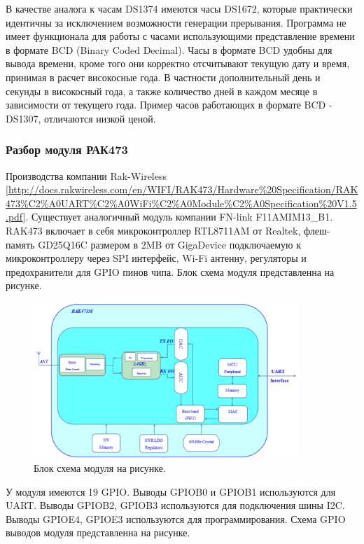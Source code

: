 В качестве аналога к часам DS1374 имеются часы DS1672, которые практически идентичны за исключением возможности генерации прерывания. 
Программа не имеет функционала для работы с часами использующими представление времени в формате BCD (Binary Coded Decimal). Часы в формате BCD удобны для вывода времени, кроме того они корректно отсчитывают текущую дату и время, принимая в расчет високосные года. В частности дополнительный день и секунды в високосный года, а также количество дней в каждом месяце в зависимости от текущего года. 
Пример часов работающих в формате BCD - DS1307, отличаются низкой ценой.


\subsubsection{ Разбор модуля РАК473 }
Производства компании Rak-Wireless [\url{http://docs.rakwireless.com/en/WIFI/RAK473/Hardware%20Specification/RAK473%C2%A0UART%C2%A0WiFi%C2%A0Module%C2%A0Specification%20V1.5.pdf}]. 
Существует аналогичный модуль компании FN-link F11AMIM13\_B1. RAK473 включает в себя микроконтроллер RTL8711AM от Realtek, флеш-память GD25Q16C размером в 2MB от GigaDevice подключаемую к микроконтроллеру через SPI интерфейс, Wi-Fi антенну, регуляторы и предохранители для GPIO пинов чипа. Блок схема модуля представленна на рисунке.

\begin{figure}[h!]
    \centering
    \includegraphics[width=0.9\textwidth]{rak473_block_diagram.png}
    \caption{Блок схема модуля на рисунке.}
\end{figure}

У модуля имеются 19 GPIO. 
Выводы GPIOB0 и GPIOB1 используются для UART.
Выводы GPIOB2, GPIOB3 используются для подключения шины I2C.
Выводы GPIOE4, GPIOE3 используются для программирования.
Схема GPIO выводов модуля представленна на рисунке.

